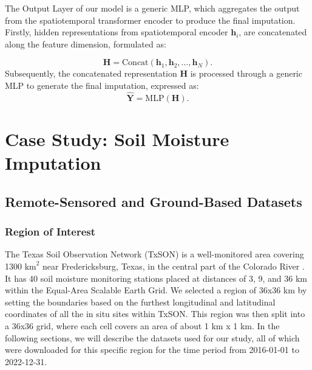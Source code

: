 \documentclass[review]{elsarticle}
\begin{document}
The Output Layer of our model is a generic MLP, which aggregates the output from the spatiotemporal transformer encoder to produce the final imputation. Firstly, hidden representations from spatiotemporal encoder $\boldsymbol{h}_i$, are concatenated along the feature dimension, formulated as:

\begin{equation}
\boldsymbol{H} = \text{Concat}(\boldsymbol{h}_1, \boldsymbol{h}_2, \ldots, \boldsymbol{h}_N).\end{equation}
Subsequently, the concatenated representation $\boldsymbol{H}$ is processed through a generic MLP to generate the final imputation, expressed as:
\begin{equation}
\hat{\boldsymbol{Y}} = \text{MLP}(\boldsymbol{H}).
\end{equation}

\section{Case Study: Soil Moisture Imputation}
\subsection{Remote-Sensored and Ground-Based Datasets}

\subsubsection*{Region of Interest}

The Texas Soil Observation Network (TxSON) is a well-monitored area covering 1300 $\text{km}^2$ near Fredericksburg, Texas, in the central part of the Colorado River \citep{caldwell2019texas}. It has 40 soil moisture monitoring stations placed at distances of 3, 9, and 36 km within the Equal-Area Scalable Earth Grid. We selected a region of 36x36 km by setting the boundaries based on the furthest longitudinal and latitudinal coordinates of all the in situ sites within TxSON. This region was then split into a 36x36 grid, where each cell covers an area of about 1 km x 1 km. 
In the following sections, we will describe the datasets used for our study, all of which were downloaded for this specific region for the time period from 2016-01-01 to 2022-12-31.
\end{document}
